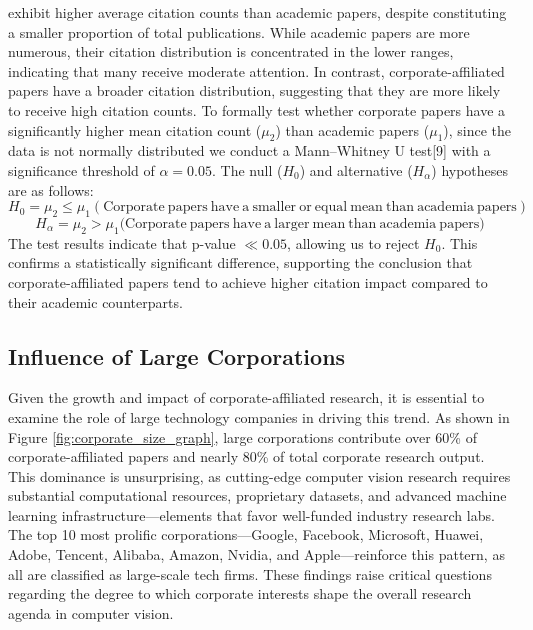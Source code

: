 \documentclass{article}
\begin{document}
exhibit higher average citation counts than academic papers, despite constituting a smaller proportion of total publications. While academic papers are more numerous, their citation distribution is concentrated in the lower ranges, indicating that many receive moderate attention. In contrast, corporate-affiliated papers have a broader citation distribution, suggesting that they are more likely to receive high citation counts. To formally test whether corporate papers have a significantly higher mean citation count ($\mu_2$) than academic papers ($\mu_1$), since the data is not normally distributed we conduct a Mann–Whitney U test[9] with a significance threshold of $\alpha = 0.05$. The null ($H_0$) and alternative ($H_\alpha$) hypotheses are as follows:
\[
H_0 = \mu_2 \leq \mu_1 (\mathrm{Corporate \ papers\ have \ a \ smaller \ or \ equal \ mean \ than \ academia \ papers})
\]
\[
H_\alpha = \mu_2 > \mu_1 (\mathrm{Corporate \ papers\ have \ a \ larger \ mean\ than \ academia \ papers)}
\]
The test results indicate that p-value $\ll 0.05$, allowing us to reject $H_0$. This confirms a statistically significant difference, supporting the conclusion that corporate-affiliated papers tend to achieve higher citation impact compared to their academic counterparts.   
\vspace{-10pt}
\subsection{Influence of Large Corporations}
\vspace{-7pt}
Given the growth and impact of corporate-affiliated research, it is essential to examine the role of large technology companies in driving this trend. As shown in Figure \ref{fig:corporate_size_graph}, large corporations contribute over 60\% of corporate-affiliated papers and nearly 80\% of total corporate research output. This dominance is unsurprising, as cutting-edge computer vision research requires substantial computational resources, proprietary datasets, and advanced machine learning infrastructure—elements that favor well-funded industry research labs. The top 10 most prolific corporations—Google, Facebook, Microsoft, Huawei, Adobe, Tencent, Alibaba, Amazon, Nvidia, and Apple—reinforce this pattern, as all are classified as large-scale tech firms. These findings raise critical questions regarding the degree to which corporate interests shape the overall research agenda in computer vision.
\end{document}
